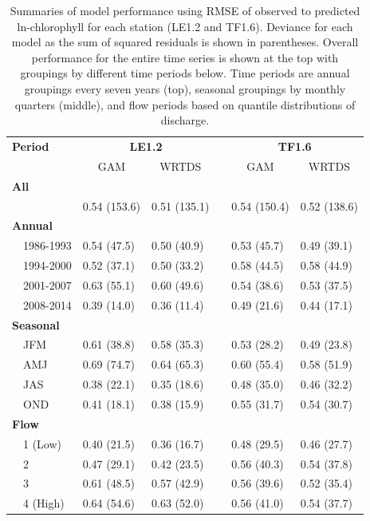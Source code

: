 \documentclass[letterpaper,12pt,oneside]{article}\usepackage[]{graphicx}\usepackage[]{color}
\begin{document}
\begin{table}[!tbp]
\caption{Summaries of model performance using \ac{RMSE} of observed to predicted ln-chlorophyll for each station (LE1.2 and TF1.6).  Deviance for each model as the sum of squared residuals is shown in parentheses. Overall performance for the entire time series is shown at the top with groupings by different time periods below.  Time periods are annual groupings every seven years (top), seasonal groupings by monthly quarters (middle), and flow periods based on quantile distributions of discharge.\label{tab:perftoobs}} 
\begin{center}
\begin{tabular}{lllcll}
\hline\hline
\multicolumn{1}{l}{\bfseries Period}&\multicolumn{2}{c}{\bfseries LE1.2}&\multicolumn{1}{c}{\bfseries }&\multicolumn{2}{c}{\bfseries TF1.6}\tabularnewline
\cline{2-3} \cline{5-6}
\multicolumn{1}{l}{}&\multicolumn{1}{c}{GAM}&\multicolumn{1}{c}{WRTDS}&\multicolumn{1}{c}{}&\multicolumn{1}{c}{GAM}&\multicolumn{1}{c}{WRTDS}\tabularnewline
\hline
{\bfseries All}&&&&&\tabularnewline
~~&0.54 (153.6)&0.51 (135.1)&&0.54 (150.4)&0.52 (138.6)\tabularnewline
\hline
{\bfseries Annual}&&&&&\tabularnewline
~~1986-1993&0.54 (47.5)&0.50 (40.9)&&0.53 (45.7)&0.49 (39.1)\tabularnewline
~~1994-2000&0.52 (37.1)&0.50 (33.2)&&0.58 (44.5)&0.58 (44.9)\tabularnewline
~~2001-2007&0.63 (55.1)&0.60 (49.6)&&0.54 (38.6)&0.53 (37.5)\tabularnewline
~~2008-2014&0.39 (14.0)&0.36 (11.4)&&0.49 (21.6)&0.44 (17.1)\tabularnewline
\hline
{\bfseries Seasonal}&&&&&\tabularnewline
~~JFM&0.61 (38.8)&0.58 (35.3)&&0.53 (28.2)&0.49 (23.8)\tabularnewline
~~AMJ&0.69 (74.7)&0.64 (65.3)&&0.60 (55.4)&0.58 (51.9)\tabularnewline
~~JAS&0.38 (22.1)&0.35 (18.6)&&0.48 (35.0)&0.46 (32.2)\tabularnewline
~~OND&0.41 (18.1)&0.38 (15.9)&&0.55 (31.7)&0.54 (30.7)\tabularnewline
\hline
{\bfseries Flow}&&&&&\tabularnewline
~~1 (Low)&0.40 (21.5)&0.36 (16.7)&&0.48 (29.5)&0.46 (27.7)\tabularnewline
~~2&0.47 (29.1)&0.42 (23.5)&&0.56 (40.3)&0.54 (37.8)\tabularnewline
~~3&0.61 (48.5)&0.57 (42.9)&&0.56 (39.6)&0.52 (35.4)\tabularnewline
~~4 (High)&0.64 (54.6)&0.63 (52.0)&&0.56 (41.0)&0.54 (37.7)\tabularnewline
\hline
\end{tabular}\end{center}

\end{table}
\end{document}
